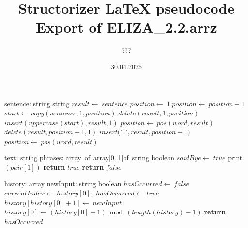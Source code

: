 \documentclass[a4paper,10pt]{article}
\title{Structorizer LaTeX pseudocode Export of ELIZA\_2.2.arrz}
\author{???}
\date{30.04.2026}
\begin{document}
\begin{algorithm}
\caption{adjustSpelling(1)}
\begin{algorithmic}[5]
\State {}
    \State sentence: string
  \EndDecl
    \State string
  \EndDecl
  \State \(result\gets\ sentence\)
  \State \(position\gets\ 1\)
    \State \(position\gets\ position+1\)
  \EndWhile
    \State \(start\gets\ copy(sentence,1,position)\)
    \State \(delete(result,1,position)\)
    \State \(insert(uppercase(start),result,1)\)
  \EndIf
    \State \(position\gets\ pos(word,result)\)
      \State \(delete(result,position+1,1)\)
      \State \(insert(\)"{}I"{}\(,result,position+1)\)
      \State \(position\gets\ pos(word,result)\)
    \EndWhile
  \EndFor
\EndFunction
\end{algorithmic}
\end{algorithm}


\begin{algorithm}
\caption{checkGoodBye(2)}
\begin{algorithmic}[5]
\State {}
\State {}
\State {}
\State {}
    \State text: string
    \State phrases: array\ of\ array[0..1]of\ string
  \EndDecl
    \State boolean
  \EndDecl
      \State \(saidBye\gets\ true\)
      \State \(\)print\((pair[1])\)
      \State \textbf{return} \(true\)
    \EndIf
  \EndFor
  \State \textbf{return} \(false\)
\EndFunction
\end{algorithmic}
\end{algorithm}


\begin{algorithm}
\caption{checkRepetition(2)}
\begin{algorithmic}[5]
\State {}
\State {}
    \State history: array
    \State newInput: string
  \EndDecl
    \State boolean
  \EndDecl
  \State \(hasOccurred\gets\ false\)
    \State \(currentIndex\gets\ history[0];\)
        \State \(hasOccurred\gets\ true\)
      \EndIf
    \EndFor
    \State \(history[history[0]+1]\gets\ newInput\)
    \State \(history[0]\gets(history[0]+1)\bmod(length(history)-1)\)
  \EndIf
  \State \textbf{return} \(hasOccurred\)
\EndFunction
\end{algorithmic}
\end{algorithm}
\end{document}
